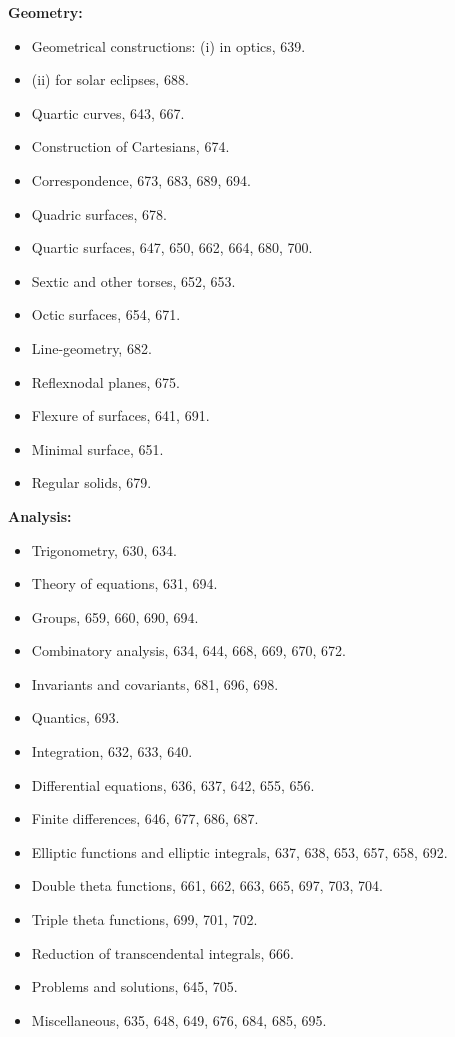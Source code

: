 \documentclass[11pt,a4paper]{book}
\begin{document}
\textbf{Geometry:}

\begin{itemize}[leftmargin=2em,label=\textbullet]
\item Geometrical constructions: (i) in optics, 639.
\item[] \phantom{Geometrical constructions:} (ii) for solar eclipses, 688.
\item Quartic curves, 643, 667.
\item Construction of Cartesians, 674.
\item Correspondence, 673, 683, 689, 694.
\item Quadric surfaces, 678.
\item Quartic surfaces, 647, 650, 662, 664, 680, 700.
\item Sextic and other torses, 652, 653.
\item Octic surfaces, 654, 671.
\item Line-geometry, 682.
\item Reflexnodal planes, 675.
\item Flexure of surfaces, 641, 691.
\item Minimal surface, 651.
\item Regular solids, 679.
\end{itemize}

\textbf{Analysis:}

\begin{itemize}[leftmargin=2em,label=\textbullet]
\item Trigonometry, 630, 634.
\item Theory of equations, 631, 694.
\item Groups, 659, 660, 690, 694.
\item Combinatory analysis, 634, 644, 668, 669, 670, 672.
\item Invariants and covariants, 681, 696, 698.
\item Quantics, 693.
\item Integration, 632, 633, 640.
\item Differential equations, 636, 637, 642, 655, 656.
\item Finite differences, 646, 677, 686, 687.
\item Elliptic functions and elliptic integrals, 637, 638, 653, 657, 658, 692.
\item Double theta functions, 661, 662, 663, 665, 697, 703, 704.
\item Triple theta functions, 699, 701, 702.
\item Reduction of transcendental integrals, 666.
\item Problems and solutions, 645, 705.
\item Miscellaneous, 635, 648, 649, 676, 684, 685, 695.
\end{itemize}
\clearpage
\end{document}
